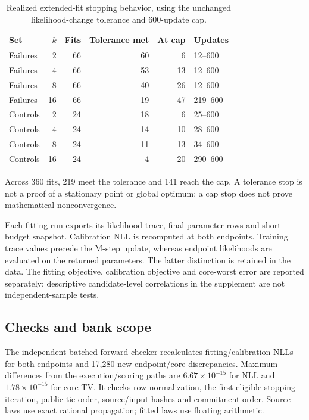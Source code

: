 \begin{table}[tbp]
\centering\caption{Realized extended-fit stopping behavior, using the unchanged likelihood-change tolerance and 600-update cap.}\label{tab:sensitivity-stopping}
\small\begin{tabular}{@{}lrrrrl@{}}\toprule
Set & $k$ & Fits & Tolerance met & At cap & Updates\\\midrule
Failures & 2 & 66 & 60 & 6 & 12--600\\
Failures & 4 & 66 & 53 & 13 & 12--600\\
Failures & 8 & 66 & 40 & 26 & 12--600\\
Failures & 16 & 66 & 19 & 47 & 219--600\\
Controls & 2 & 24 & 18 & 6 & 25--600\\
Controls & 4 & 24 & 14 & 10 & 28--600\\
Controls & 8 & 24 & 11 & 13 & 34--600\\
Controls & 16 & 24 & 4 & 20 & 290--600\\\bottomrule
\end{tabular}
\par\smallskip\footnotesize Across 360 fits, 219 meet the tolerance and 141 reach the cap. A tolerance stop is not a proof of a stationary point or global optimum; a cap stop does not prove mathematical nonconvergence.
\end{table}


Each fitting run exports its likelihood trace, final parameter rows and short-budget snapshot. Calibration NLL is recomputed at both endpoints. Training trace values precede the M-step update, whereas endpoint likelihoods are evaluated on the returned parameters. The latter distinction is retained in the data. The fitting objective, calibration objective and core-worst error are reported separately; descriptive candidate-level correlations in the supplement are not independent-sample tests.

\subsection{Checks and bank scope}
The independent batched-forward checker recalculates fitting/calibration NLLs for both endpoints and 17,280 new endpoint/core discrepancies. Maximum differences from the execution/scoring paths are $6.67\times10^{-15}$ for NLL and $1.78\times10^{-15}$ for core TV. It checks row normalization, the first eligible stopping iteration, public tie order, source/input hashes and commitment order. Source laws use exact rational propagation; fitted laws use floating arithmetic.

